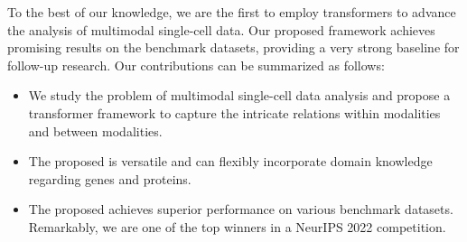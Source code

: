 To the best of our knowledge, we are the first to employ transformers to advance the analysis of multimodal single-cell  data. Our proposed framework achieves promising results on the benchmark datasets, providing a very strong baseline for follow-up research. Our contributions can be summarized as follows: 
\vspace{-1em}
\begin{itemize}[leftmargin=*]
    \item We study the problem of multimodal single-cell data analysis and propose a transformer framework \method{} to capture the intricate relations within modalities and between modalities. %
    \item The proposed \method{} is versatile and can flexibly incorporate domain knowledge regarding genes and proteins. %
    \item The proposed \method{} achieves superior performance on various benchmark datasets. Remarkably, we are one of the top winners in a NeurIPS 2022 competition. 
\end{itemize}

